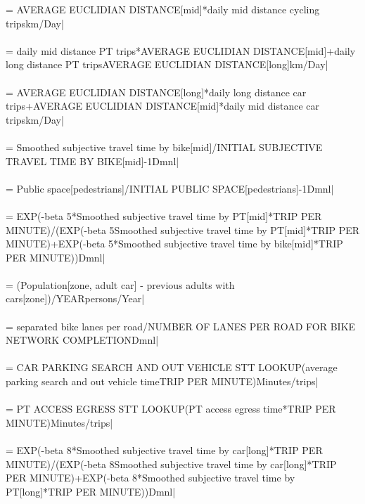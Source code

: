  = AVERAGE EUCLIDIAN DISTANCE[mid]*daily mid distance cycling tripskm/Day| \\ \\ 
 = daily mid distance PT trips*AVERAGE EUCLIDIAN DISTANCE[mid]+daily long distance PT trips\*AVERAGE EUCLIDIAN DISTANCE[long]km/Day| \\ \\ 
 = AVERAGE EUCLIDIAN DISTANCE[long]*daily long distance car trips+AVERAGE EUCLIDIAN DISTANCE[mid]*daily mid distance car tripskm/Day| \\ \\ 
 = Smoothed subjective travel time by bike[mid]/INITIAL SUBJECTIVE TRAVEL TIME BY BIKE[mid]-1Dmnl| \\ \\ 
 = Public space[pedestrians]/INITIAL PUBLIC SPACE[pedestrians]-1Dmnl| \\ \\ 
 = EXP(-beta 5*Smoothed subjective travel time by PT[mid]*TRIP PER MINUTE)/(EXP(-beta 5\*Smoothed subjective travel time by PT[mid]*TRIP PER MINUTE)+EXP(-beta 5*Smoothed subjective travel time by bike[mid]*TRIP PER MINUTE))Dmnl| \\ \\ 
 = (Population[zone, adult car] - previous adults with cars[zone])/YEARpersons/Year| \\ \\ 
 = separated bike lanes per road/NUMBER OF LANES PER ROAD FOR BIKE NETWORK COMPLETIONDmnl| \\ \\ 
 = CAR PARKING SEARCH AND OUT VEHICLE STT LOOKUP(average parking search and out vehicle time\*TRIP PER MINUTE)Minutes/trips| \\ \\ 
 = PT ACCESS EGRESS STT LOOKUP(PT access egress time*TRIP PER MINUTE)Minutes/trips| \\ \\ 
 = EXP(-beta 8*Smoothed subjective travel time by car[long]*TRIP PER MINUTE)/(EXP(-beta 8\*Smoothed subjective travel time by car[long]*TRIP PER MINUTE)+EXP(-beta 8*Smoothed subjective travel time by PT[long]*TRIP PER MINUTE))Dmnl| \\ \\ 
